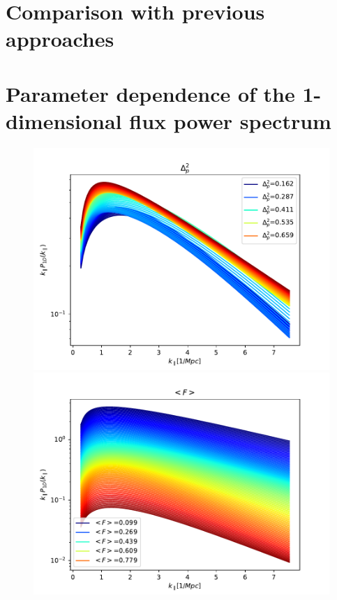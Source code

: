 \documentclass[]{article}
\begin{document}
\section{Comparison with previous approaches}



\clearpage
\appendix
\section{Parameter dependence of the 1-dimensional flux power spectrum}
\begin{figure}[h]
    \centering
    \includegraphics[scale=0.47]{Figures/256_Delta2_p.pdf}
    \includegraphics[scale=0.47]{Figures/256_mF.pdf}

\end{figure}
\end{document}
